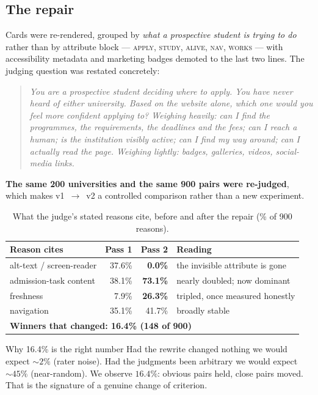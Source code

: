 \documentclass[11pt,a4paper]{article}
\begin{document}
\subsection{The repair}

Cards were re-rendered, grouped by \emph{what a prospective student is trying to do} rather
than by attribute block --- \textsc{apply}, \textsc{study}, \textsc{alive}, \textsc{nav},
\textsc{works} --- with accessibility metadata and marketing badges demoted to the last two
lines. The judging question was restated concretely:

\begin{quote}\small\itshape
You are a prospective student deciding where to apply. You have never heard of either
university. Based on the website alone, which one would you feel more confident applying to?
Weighing heavily: can I find the programmes, the requirements, the deadlines and the fees; can
I reach a human; is the institution visibly active; can I find my way around; can I actually
read the page. Weighing lightly: badges, galleries, videos, social-media links.
\end{quote}

\noindent \textbf{The same 200 universities and the same 900 pairs were re-judged}, which makes
v1~$\rightarrow$~v2 a controlled comparison rather than a new experiment.

\begin{table}[H]\centering\small
\caption{What the judge's stated reasons cite, before and after the repair (\% of 900 reasons).}
\begin{tabular}{lrrl}
\toprule
\textbf{Reason cites} & \textbf{Pass 1} & \textbf{Pass 2} & \textbf{Reading} \\
\midrule
alt-text / screen-reader & 37.6\% & \textbf{0.0\%}  & the invisible attribute is gone \\
admission-task content   & 38.1\% & \textbf{73.1\%} & nearly doubled; now dominant \\
freshness                &  7.9\% & \textbf{26.3\%} & tripled, once measured honestly \\
navigation               & 35.1\% & 41.7\%          & broadly stable \\
\midrule
\multicolumn{4}{l}{\textbf{Winners that changed: 16.4\% (148 of 900)}} \\
\bottomrule
\end{tabular}
\end{table}

\begin{keybox}{Why 16.4\% is the right number}
Had the rewrite changed nothing we would expect ${\sim}2\%$ (rater noise). Had the judgments
been arbitrary we would expect ${\sim}45\%$ (near-random). We observe $16.4\%$: obvious pairs
held, close pairs moved. That is the signature of a genuine change of criterion.
\end{keybox}
\end{document}
